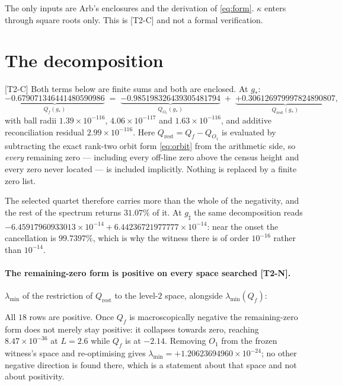\documentclass[11pt,a4paper]{article}
\theoremstyle{definition}
\theoremstyle{remark}
\newcommand{\tier}[1]{{\small\textsf{[#1]}}}
\newcommand{\lmin}{\lambda_{\min}}
\newcommand{\Qrest}{Q_{\mathrm{rest}}}
\begin{document}
\noindent The only inputs are Arb's enclosures and the derivation of \eqref{eq:form}.
$\kappa$ enters through square roots only. This is \tier{T2-C} and not a formal
verification.

\section{The decomposition}\label{sec:decomp}

\tier{T2-C} Both terms below are finite sums and both are enclosed. At $g_*$:
\begin{equation}\label{eq:decomp}
\underbrace{-0.679071346441480590986}_{Q_f(g_*)}
\;=\;
\underbrace{-0.985198326439305481794}_{Q_{O_1}(g_*)}
\;+\;
\underbrace{+0.306126979997824890807}_{\Qrest(g_*)},
\end{equation}
with ball radii $1.39\times10^{-116}$, $4.06\times10^{-117}$ and $1.63\times10^{-116}$,
and additive reconciliation residual $2.99\times10^{-116}$. Here $\Qrest = Q_f - Q_{O_1}$
is evaluated by subtracting the exact rank-two orbit form \eqref{eq:orbit} from the
arithmetic side, so \emph{every} remaining zero --- including every off-line zero above
the census height and every zero never located --- is included implicitly. Nothing is
replaced by a finite zero list.

The selected quartet therefore carries more than the whole of the negativity, and the
rest of the spectrum returns $31.07\%$ of it. At $g_\sharp$ the same decomposition reads
$-6.45917960933013\times10^{-14} + 6.44236721977777\times10^{-14}$: near the onset the
cancellation is $99.7397\%$, which is why the witness there is of order $10^{-16}$ rather than
$10^{-14}$.

\paragraph{The remaining-zero form is positive on every space searched \tier{T2-N}.}
$\lmin$ of the restriction of $\Qrest$ to the level-$2$ space, alongside $\lmin(Q_f)$:



\noindent All $18$ rows are positive. Once $Q_f$ is macroscopically negative the
remaining-zero form does not merely stay positive: it collapses towards zero, reaching
$8.47\times10^{-36}$ at $L=2.6$ while $Q_f$ is at $-2.14$. Removing $O_1$ from the frozen
witness's space and re-optimising gives $\lmin = +1.20623694960\times10^{-24}$; no other
negative direction is found there, which is a statement about that space and not about
positivity.
\end{document}
